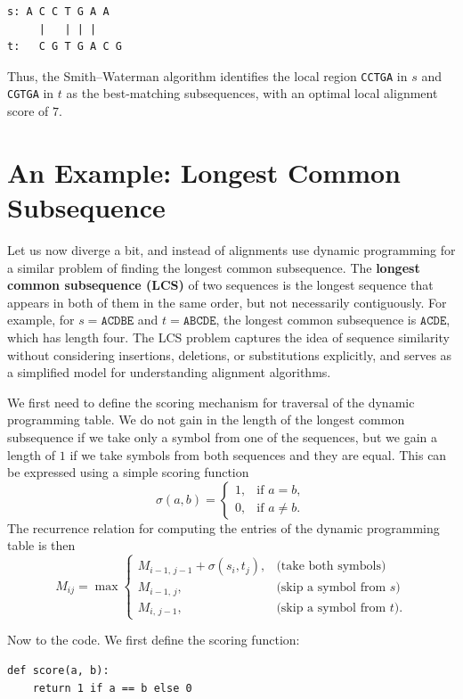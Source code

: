 \begin{verbatim}
s: A C C T G A A
     |   | | |
t:   C G T G A C G
\end{verbatim}

Thus, the Smith--Waterman algorithm identifies the local region \texttt{CCTGA} in $s$ and \texttt{CGTGA} in $t$ as the best-matching subsequences, with an optimal local alignment score of $7$.


\section{An Example: Longest Common Subsequence}

Let us now diverge a bit, and instead of alignments use dynamic programming for a similar problem of finding the longest common subsequence. The \textbf{longest common subsequence (LCS)} of two sequences is the longest sequence that appears in both of them in the same order, but not necessarily contiguously. For example, for $s=\texttt{ACDBE}$ and $t=\texttt{ABCDE}$, the longest common subsequence is $\texttt{ACDE}$, which has length four. The LCS problem captures the idea of sequence similarity without considering insertions, deletions, or substitutions explicitly, and serves as a simplified model for understanding alignment algorithms.

We first need to define the scoring mechanism for traversal of the dynamic programming table. We do not gain in the length of the longest common subsequence if we take only a symbol from one of the sequences, but we gain a length of $1$ if we take symbols from both sequences and they are equal. This can be expressed using a simple scoring function
\[
\sigma(a,b) =
\begin{cases}
1, & \text{if } a = b,\\[4pt]
0, & \text{if } a \neq b.
\end{cases}
\]
The recurrence relation for computing the entries of the dynamic programming table is then
\[
M_{ij} = \max
\begin{cases}
M_{i-1,\,j-1} + \sigma(s_i, t_j), & \text{(take both symbols)}\\[6pt]
M_{i-1,\,j}, & \text{(skip a symbol from $s$)}\\[6pt]
M_{i,\,j-1}, & \text{(skip a symbol from $t$)}.
\end{cases}
\]

Now to the code. We first define the scoring function:

\vspace*{3mm}
\begin{lstlisting}
def score(a, b):
    return 1 if a == b else 0
\end{lstlisting}

